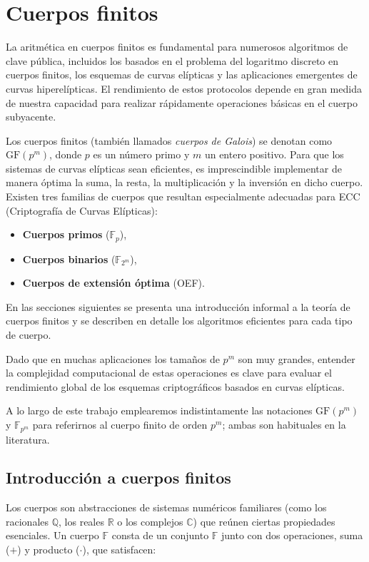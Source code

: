 \chapter{Cuerpos finitos}\label{chap:Campos_finitos}
La aritmética en cuerpos finitos es fundamental para numerosos algoritmos de clave pública, incluidos los basados en el problema del logaritmo discreto en cuerpos finitos, los esquemas de curvas elípticas y las aplicaciones emergentes de curvas hiperelípticas. El rendimiento de estos protocolos depende en gran medida de nuestra capacidad para realizar rápidamente operaciones básicas en el cuerpo subyacente.  

Los cuerpos finitos (también llamados \emph{cuerpos de Galois}) se denotan como \(\mathrm{GF}(p^m)\), donde \(p\) es un número primo y \(m\) un entero positivo. Para que los sistemas de curvas elípticas sean eficientes, es imprescindible implementar de manera óptima la suma, la resta, la multiplicación y la inversión en dicho cuerpo. Existen tres familias de cuerpos que resultan especialmente adecuadas para ECC (Criptografía de Curvas Elípticas):  
\begin{itemize}
  \item \textbf{Cuerpos primos} (\(\mathbb{F}_p\)),  
  \item \textbf{Cuerpos binarios} (\(\mathbb{F}_{2^m}\)),  
  \item \textbf{Cuerpos de extensión óptima} (OEF).  
\end{itemize}
En las secciones siguientes se presenta una introducción informal a la teoría de cuerpos finitos y se describen en detalle los algoritmos eficientes para cada tipo de cuerpo.  

Dado que en muchas aplicaciones los tamaños de \(p^m\) son muy grandes, entender la complejidad computacional de estas operaciones es clave para evaluar el rendimiento global de los esquemas criptográficos basados en curvas elípticas.  

A lo largo de este trabajo emplearemos indistintamente las notaciones \(\mathrm{GF}(p^m)\) y \(\mathbb{F}_{p^m}\) para referirnos al cuerpo finito de orden \(p^m\); ambas son habituales en la literatura.

\section{Introducción a cuerpos finitos}
Los cuerpos son abstracciones de sistemas numéricos familiares (como los racionales \(\mathbb{Q}\), los reales \(\mathbb{R}\) o los complejos \(\mathbb{C}\)) que reúnen ciertas propiedades esenciales. Un cuerpo \(\mathbb{F}\) consta de un conjunto \(\mathbb{F}\) junto con dos operaciones, suma (\(+\)) y producto (\(\cdot\)), que satisfacen:


